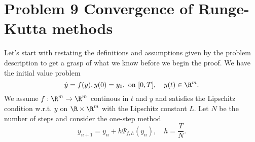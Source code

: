 \section{Problem 9 Convergence of Runge-Kutta methods}
  Let's start with restating the definitions and assumptions given by the problem description to get a grasp of what we know before we begin the proof.
  We have the initial value problem
    $$\dot{y}=f(y), y(0)=y_{0}, \text{ on } [0, T], \quad y(t) \in \R^m .$$
  We assume $f:\R^m \to \R^m$ continous in $t$ and $y$ and satisfies the Lipschitz condition w.r.t. $y$ on $\R\times \R^m$ with the Lipschitz constant $L$. Let $N$ be the number of steps and consider the one-step method
  \begin{equation}\label{onestep}
    y_{n+1}=y_{n}+h \Psi_{f, h}\left(y_{n}\right), \quad h=\frac{T}{N}.
  \end{equation}
